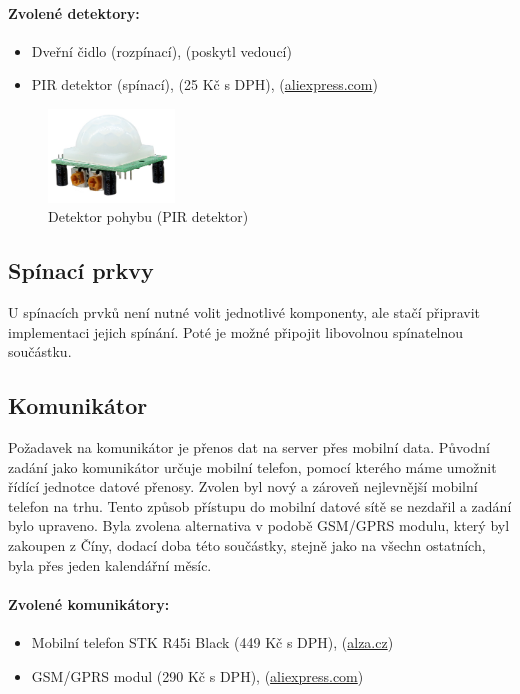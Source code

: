 \documentclass[FM,DP]{tulthesis}  %
\begin{document}
\paragraph{Zvolené detektory:}
\begin{itemize}
\item Dveřní čidlo (rozpínací), (poskytl vedoucí)
\item PIR detektor (spínací), (25 Kč s DPH), (\url{aliexpress.com})
\end{itemize} 

\begin{figure}[H]
\begin{center}
\includegraphics[width=0.3\textwidth]{images/PIR.jpg}
\caption{Detektor pohybu (PIR detektor)}
\label{image}
\end{center}
\end{figure}

\subsection{Spínací prkvy}
U spínacích prvků není nutné volit jednotlivé komponenty, ale stačí připravit implementaci jejich spínání. Poté je možné připojit libovolnou spínatelnou součástku.

\subsection{Komunikátor}
Požadavek na komunikátor je přenos dat na server přes mobilní data. Původní zadání jako komunikátor určuje mobilní telefon, pomocí kterého máme umožnit řídící jednotce datové přenosy. Zvolen byl nový a zároveň nejlevnější mobilní telefon na trhu. Tento způsob přístupu do mobilní datové sítě se nezdařil a zadání bylo upraveno. Byla zvolena alternativa v podobě GSM/GPRS modulu, který byl zakoupen z Číny, dodací doba této součástky, stejně jako na všechn ostatních, byla přes jeden kalendářní měsíc.

\paragraph{Zvolené komunikátory:}
\begin{itemize}
\item Mobilní telefon STK R45i Black (449 Kč s DPH), (\url{alza.cz})
\item GSM/GPRS modul (290 Kč s DPH), (\url{aliexpress.com})
\end{itemize} 
\end{document}
